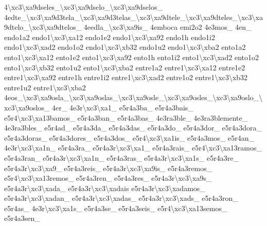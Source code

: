 \begin{DoxyCompactItemize}
4\textbackslash{}xc3\textbackslash{}xa9dseles\-\_\textbackslash{}xc3\textbackslash{}xa9dselo\-\_\textbackslash{}xc3\textbackslash{}xa9dselos\-\_\- 4edte\-\_\textbackslash{}xc3\textbackslash{}xa9d3tela\-\_\textbackslash{}xc3\textbackslash{}xa9d3telas\-\_\textbackslash{}xc3\textbackslash{}xa9dtele\-\_\textbackslash{}xc3\textbackslash{}xa9dteles\-\_\textbackslash{}xc3\textbackslash{}xa9dtelo\-\_\textbackslash{}xc3\textbackslash{}xa9dtelos\-\_\- 4eedla\-\_\textbackslash{}xc3\textbackslash{}xa9is\-\_\- 4emboca emi2o2 4e3mos\-\_\- 4en\-\_\- endo1a2 endo1\textbackslash{}xc3\textbackslash{}xa12 endo1e2 endo1\textbackslash{}xc3\textbackslash{}xa92 endo1h endo1i2 endo1\textbackslash{}xc3\textbackslash{}xad2 endo1o2 endo1\textbackslash{}xc3\textbackslash{}xb32 endo1u2 endo1\textbackslash{}xc3\textbackslash{}xba2 ento1a2 ento1\textbackslash{}xc3\textbackslash{}xa12 ento1e2 ento1\textbackslash{}xc3\textbackslash{}xa92 ento1h ento1i2 ento1\textbackslash{}xc3\textbackslash{}xad2 ento1o2 ento1\textbackslash{}xc3\textbackslash{}xb32 ento1u2 ento1\textbackslash{}xc3\textbackslash{}xba2 entre1a2 entre1\textbackslash{}xc3\textbackslash{}xa12 entre1e2 entre1\textbackslash{}xc3\textbackslash{}xa92 entre1h entre1i2 entre1\textbackslash{}xc3\textbackslash{}xad2 entre1o2 entre1\textbackslash{}xc3\textbackslash{}xb32 entre1u2 entre1\textbackslash{}xc3\textbackslash{}xba2 4eos\-\_\textbackslash{}xc3\textbackslash{}xa9osla\-\_\textbackslash{}xc3\textbackslash{}xa9oslas\-\_\textbackslash{}xc3\textbackslash{}xa9osle\-\_\textbackslash{}xc3\textbackslash{}xa9osles\-\_\textbackslash{}xc3\textbackslash{}xa9oslo\-\_\textbackslash{}xc3\textbackslash{}xa9oslos\-\_\- 4er\-\_\- 4e3r\textbackslash{}xc3\textbackslash{}xa1\-\_\- e5r4a3ba\-\_\- e5r4a3bais\-\_\- e5r4\textbackslash{}xc3\textbackslash{}xa13bamos\-\_\- e5r4a3ban\-\_\- e5r4a3bas\-\_\- 4e3ra3ble\-\_\- 4e3ra3blemente\-\_\- 4e3ra3bles\-\_\- e5r4ad\-\_\- e5r4a3da\-\_\- e5r4a3das\-\_\- e5r4a3do\-\_\- e5r4a3dor\-\_\- e5r4a3dora\-\_\- e5r4a3doras\-\_\- e5r4a3dores\-\_\- e5r4a3dos\-\_\- e5r4\textbackslash{}xc3\textbackslash{}xa1is\-\_\- e5r4a3mos\-\_\- e5r4an\-\_\- 4e3r\textbackslash{}xc3\textbackslash{}xa1n\-\_\- e5r4a3ra\-\_\- e5r4a3r\textbackslash{}xc3\textbackslash{}xa1\-\_\- e5r4a3rais\-\_\- e5r4\textbackslash{}xc3\textbackslash{}xa13ramos\-\_\- e5r4a3ran\-\_\- e5r4a3r\textbackslash{}xc3\textbackslash{}xa1n\-\_\- e5r4a3ras\-\_\- e5r4a3r\textbackslash{}xc3\textbackslash{}xa1s\-\_\- e5r4a3re\-\_\- e5r4a3r\textbackslash{}xc3\textbackslash{}xa9\-\_\- e5r4a3reis\-\_\- e5r4a3r\textbackslash{}xc3\textbackslash{}xa9is\-\_\- e5r4a3remos\-\_\- e5r4\textbackslash{}xc3\textbackslash{}xa13remos\-\_\- e5r4a3ren\-\_\- e5r4a3res\-\_\- e5r4a3r\textbackslash{}xc3\textbackslash{}xa9s\-\_\- e5r4a3r\textbackslash{}xc3\textbackslash{}xada\-\_\- e5r4a3r\textbackslash{}xc3\textbackslash{}xadais e5r4a3r\textbackslash{}xc3\textbackslash{}xadamos\-\_\- e5r4a3r\textbackslash{}xc3\textbackslash{}xadan\-\_\- e5r4a3r\textbackslash{}xc3\textbackslash{}xadas\-\_\- e5r4a3r\textbackslash{}xc3\textbackslash{}xads\-\_\- e5r4a3ron\-\_\- e5r4as\-\_\- 4e3r\textbackslash{}xc3\textbackslash{}xa1s\-\_\- e5r4a3se\-\_\- e5r4a3seis\-\_\- e5r4\textbackslash{}xc3\textbackslash{}xa13semos\-\_\- e5r4a3sen\-\_\- 
\end{DoxyCompactItemize}
